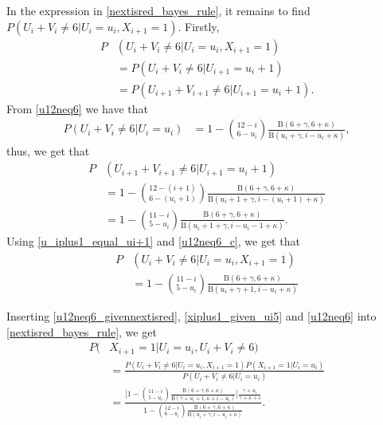 In the expression in \eqref{nextisred_bayes_rule}, it remains to find $P(U_i+V_i\neq6|U_i=u_i,X_{i+1}=1)$.
Firstly, 
\begin{equation}
\label{u_iplus1_equal_ui+1}
    \begin{aligned}
        P&(U_i+V_i\neq6|U_i=u_i,X_{i+1}=1) \\[6pt]
        &= P(U_i+V_i\neq6|U_{i+1}=u_i+1)
        \\[6pt]
        &= P(U_{i+1}+V_{i+1}\neq6|U_{i+1}=u_i+1).
    \end{aligned}
\end{equation}
From \eqref{u12neq6} we have that
\begin{equation}
\label{u12neq6_b}
    \begin{aligned}
        P(U_i+V_i\neq6|U_i=u_i) 
        &= 1-\binom{12-i}{6-u_i} \frac{\text{B}(6+\gamma,6+\kappa)}{\text{B}(u_i+\gamma,i-u_i+\kappa)},
    \end{aligned}
\end{equation}
thus, we get that
\begin{equation}
\label{u12neq6_c}
    \begin{aligned}
        P&(U_{i+1}+V_{i+1}\neq6|U_{i+1}=u_i+1) \\[6pt]
        &= 1-\binom{12-(i+1)}{6-(u_i+1)} \frac{\text{B}(6+\gamma,6+\kappa)}{\text{B}(u_i+1+\gamma,i-(u_i+1)+\kappa)}\\[6pt]
        &= 1-\binom{11-i}{5-u_i} \frac{\text{B}(6+\gamma,6+\kappa)}{\text{B}(u_i+1+\gamma,i-u_i-1+\kappa)}.
    \end{aligned}
\end{equation}
Using \eqref{u_iplus1_equal_ui+1} and \eqref{u12neq6_c}, we get that 
\begin{equation}
\label{u12neq6_givennextisred}
    \begin{aligned}
        P&(U_i+V_i\neq6|U_i=u_i,X_{i+1}=1)\\[6pt] 
        &= 1-\binom{11-i}{5-u_i} \frac{\text{B}(6+\gamma,6+\kappa)}{\text{B}(u_i+\gamma+1,i-u_i+\kappa)}
    \end{aligned}
\end{equation}

Inserting \eqref{u12neq6_givennextisred}, \eqref{xiplus1_given_ui5} and \eqref{u12neq6} into \eqref{nextisred_bayes_rule}, we get
\begin{equation}
\label{nextisred_given_majority}
    \begin{aligned}
        P(&X_{i+1}=1|U_i=u_i,U_i+V_i\neq6) \\[6pt]
        &= \frac{P(U_i+V_i\neq6|U_i=u_i,X_{i+1}=1)P(X_{i+1}=1|U_i=u_i)}
        {P(U_i+V_i\neq6|U_i=u_i)}\\[6pt]
        &= \frac{\bigg[ 1 - \binom{11-i}{5-u_i}\frac{\text{B}(6+\gamma,6+\kappa)}{\text{B}(\gamma+u_i+1,\kappa+i-u_i)} \bigg]
        \frac{\gamma+u_i}
        {\gamma+\kappa+i}}
        {1-\binom{12-i}{6-u_i} \frac{\text{B}(6+\gamma,6+\kappa)}{\text{B}(u_i+\gamma,i-u_i+\kappa)}}.
    \end{aligned}
\end{equation}

